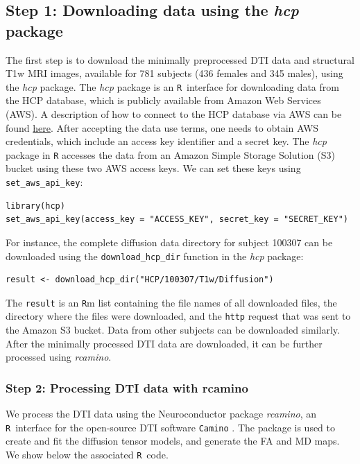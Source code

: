 \documentclass[]{elsarticle} %
\newcommand{\code}[1]{\texttt{#1}}
\newcommand{\pkg}[1]{\emph{#1}}
\newcommand{\rlang}{\texttt{R}}
\begin{document}
\subsection{Step 1: Downloading data using the \pkg{hcp} package}
The first step is to download the minimally preprocessed DTI data \citep{hcpminimal} and structural T1w MRI images, available  for 781 subjects (436 females and 345 males), using the \pkg{hcp} \citep{hcp} package.  The \pkg{hcp} package is an \rlang~interface for downloading data from the HCP database, which is publicly available from Amazon Web Services (AWS). A description of how to connect to the HCP database via AWS can be found \href{https://wiki.humanconnectome.org/display/PublicData/How+To+Connect+to+Connectome+Data+via+AWS}{here}.  After accepting the data use terms, one needs to obtain AWS credentials, which include an access key identifier and a secret  key. The \pkg{hcp} package in {\rlang} accesses the data from an Amazon Simple Storage Solution (S3) bucket using these two AWS access keys.  We can set these keys using \code{set\_aws\_api\_key}:
\color{blue}
\begin{verbatim}
library(hcp)
set_aws_api_key(access_key = "ACCESS_KEY", secret_key = "SECRET_KEY")
\end{verbatim}
\color{black}
For instance, the complete diffusion data directory for subject 100307 can be downloaded using the \code{download\_hcp\_dir} function in the \pkg{hcp} package:
\color{blue}
\begin{verbatim}
result <- download_hcp_dir("HCP/100307/T1w/Diffusion")
\end{verbatim}
\color{black}
The \code{result} is an {\rlang}m list containing the file names of all downloaded files, the directory where the files were downloaded, and the \texttt{http} request that was sent to the Amazon S3 bucket. Data from other subjects can be downloaded similarly. After the minimally processed DTI data are downloaded, it can be further processed using \pkg{rcamino}. 

\subsubsection{Step 2: Processing DTI data with rcamino}

We process the DTI data using the Neuroconductor package \pkg{rcamino}, an \rlang~interface for the open-source DTI software \texttt{Camino} \citep{camino}. The package is used to create and fit the diffusion tensor models, and generate the FA and MD maps. We show below the associated \rlang~code. 
\end{document}
